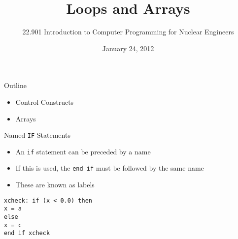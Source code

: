 \documentclass{beamer}
\title[]{Loops and Arrays}
\author[]{22.901 Introduction to Computer Programming for Nuclear Engineers}
\institute[\insertpagenumber]{}
\date{January 24, 2012}
\begin{document}

\frame{\titlepage}

\begin{frame}{Outline}
  \begin{itemize}
    \item Control Constructs
    \item Arrays
  \end{itemize}
\end{frame}
\begin{frame}{Named \texttt{IF} Statements}

  \begin{itemize}
    \item An \texttt{if} statement can be preceded by a name
    \vfill\item If this is used, the \texttt{end if} must be followed by the same name
    \vfill\item These are known as labels
  \end{itemize}
  \vfill
  \texttt{xcheck: if (x < 0.0) then} \\
    \hspace{0.1cm} \texttt{x = a} \\
  \texttt{else} \\
    \hspace{0.1cm} \texttt{x = c} \\
  \texttt{end if xcheck}

\end{frame}
\end{document}
